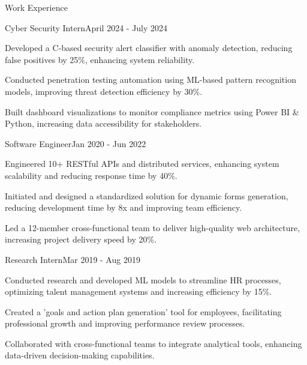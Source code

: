 \documentclass{resume} %
\begin{document}
    \begin{rSection}{Work Experience}
                    \begin{rSubsection}
                {Cyber Security Intern}{April 2024 - July 2024}
                                    {}
                                {}
                                    \item Developed a C{-}based security alert classifier with anomaly detection, reducing false positives by 25\%, enhancing system reliability.
                                    \item Conducted penetration testing automation using ML{-}based pattern recognition models, improving threat detection efficiency by 30\%.
                                    \item Built dashboard visualizations to monitor compliance metrics using Power BI \& Python, increasing data accessibility for stakeholders.
                            \end{rSubsection}
                    \begin{rSubsection}
                {Software Engineer}{Jan 2020 - Jun 2022}
                                    {}
                                {}
                                    \item Engineered 10+ RESTful APIs and distributed services, enhancing system scalability and reducing response time by 40\%.
                                    \item Initiated and designed a standardized solution for dynamic forms generation, reducing development time by 8x and improving team efficiency.
                                    \item Led a 12{-}member cross{-}functional team to deliver high{-}quality web architecture, increasing project delivery speed by 20\%.
                            \end{rSubsection}
                    \begin{rSubsection}
                {Research Intern}{Mar 2019 - Aug 2019}
                                    {}
                                {}
                                    \item Conducted research and developed ML models to streamline HR processes, optimizing talent management systems and increasing efficiency by 15\%.
                                    \item Created a 'goals and action plan generation' tool for employees, facilitating professional growth and improving performance review processes.
                                    \item Collaborated with cross{-}functional teams to integrate analytical tools, enhancing data{-}driven decision{-}making capabilities.
                            \end{rSubsection}
            \end{rSection}
\end{document}

